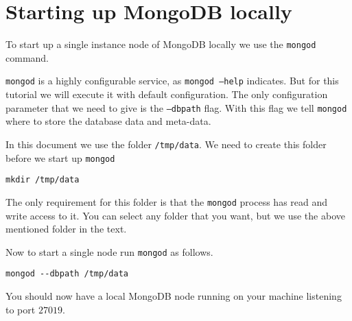 \section{Starting up MongoDB locally}\label{sec:stargin_up_mongodb_locally}
To start up a single instance node of MongoDB locally we use the \texttt{mongod} command.

\texttt{mongod} is a highly configurable service, as \texttt{mongod --help} indicates. But for this tutorial we will execute it with default configuration. The only configuration parameter that we need to give is the \texttt{--dbpath} flag. With this flag we tell \texttt{mongod} where to store the database data and meta-data.

In this document we use the folder \texttt{/tmp/data}. We need to create this folder before we start up \texttt{mongod}

\begin{lstlisting}
mkdir /tmp/data
\end{lstlisting}

The only requirement for this folder is that the \texttt{mongod} process has read and write access to it. You can select any folder that you want, but we use the above mentioned folder in the text.

Now to start a single node run \texttt{mongod} as follows.

\begin{lstlisting}
mongod --dbpath /tmp/data
\end{lstlisting}

You should now have a local MongoDB node running on your machine listening to port $27019$.
